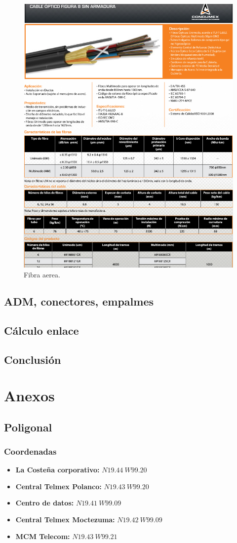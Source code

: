 \documentclass[12pt,letterpaper]{article}
\begin{document}
\newpage
\begin{figure}[ht]
    \centering
    \includegraphics[width=.67\textwidth]{imagenes/fibra2.PNG}
    \caption{Fibra aerea.}
\end{figure}


\newpage
\subsection{ADM, conectores, empalmes}

\subsection{Cálculo enlace}

\subsection{Conclusión}


\newpage
\section{Anexos}
\subsection{Poligonal}
\subsubsection{Coordenadas}
\begin{itemize}
    \item \textbf{La Costeña corporativo:} $N 19.44 \ W 99.20$
    \item \textbf{Central Telmex Polanco:} $N 19.43 \ W 99.20$
    \item \textbf{Centro de datos:} $N 19.41 \ W 99.09$
    \item \textbf{Central Telmex Moctezuma:} $N 19.42 \ W 99.09$
    \item \textbf{MCM Telecom:} $N 19.43 \ W 99.21$
\end{itemize}
\end{document}
